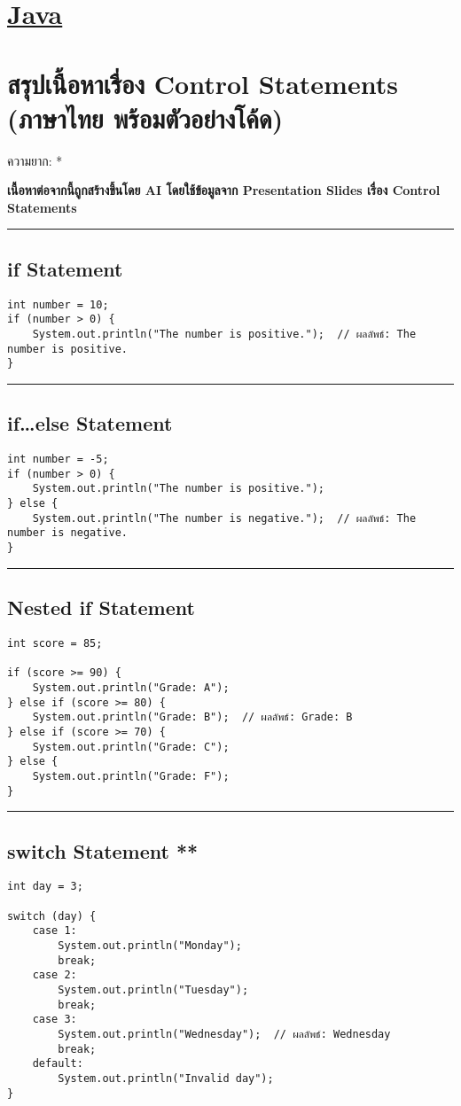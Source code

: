 \documentclass[11pt]{article}
\date{\today}
\title{}
\begin{document}
\tableofcontents

\section{\href{./index.org}{\textbf{Java}}}
\label{sec:orgd7e1155}
\section{สรุปเนื้อหาเรื่อง Control Statements (ภาษาไทย พร้อมตัวอย่างโค้ด)}
\label{sec:org951248f}
ความยาก: *

\textbf{เนื้อหาต่อจากนี้ถูกสร้างขึ้นโดย AI โดยใช้ข้อมูลจาก Presentation Slides เรื่อง Control Statements}

\noindent\rule{\textwidth}{0.5pt}
\subsection{if Statement}
\label{sec:org04a4692}
\begin{verbatim}
int number = 10;
if (number > 0) {
    System.out.println("The number is positive.");  // ผลลัพธ์: The number is positive.
}
\end{verbatim}

\noindent\rule{\textwidth}{0.5pt}
\subsection{if\ldots{}else Statement}
\label{sec:orgede11d1}
\begin{verbatim}
int number = -5;
if (number > 0) {
    System.out.println("The number is positive.");
} else {
    System.out.println("The number is negative.");  // ผลลัพธ์: The number is negative.
}
\end{verbatim}

\noindent\rule{\textwidth}{0.5pt}
\subsection{Nested if Statement}
\label{sec:org850fcbb}
\begin{verbatim}
int score = 85;

if (score >= 90) {
    System.out.println("Grade: A");
} else if (score >= 80) {
    System.out.println("Grade: B");  // ผลลัพธ์: Grade: B
} else if (score >= 70) {
    System.out.println("Grade: C");
} else {
    System.out.println("Grade: F");
}
\end{verbatim}

\noindent\rule{\textwidth}{0.5pt}
\subsection{switch Statement **}
\label{sec:orgad536ac}
\begin{verbatim}
int day = 3;

switch (day) {
    case 1:
        System.out.println("Monday");
        break;
    case 2:
        System.out.println("Tuesday");
        break;
    case 3:
        System.out.println("Wednesday");  // ผลลัพธ์: Wednesday
        break;
    default:
        System.out.println("Invalid day");
}
\end{verbatim}
\end{document}
